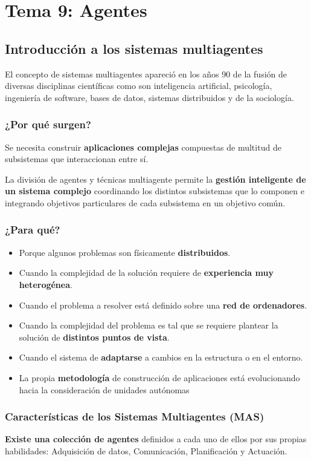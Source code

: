 \documentclass[12pt, twoside, openright]{report} %
\begin{document}
\chapter{Tema 9: Agentes}
\section{Introducción a los sistemas multiagentes}
El concepto de sistemas multiagentes apareció en los años 90 de la fusión de diversas disciplinas científicas como son inteligencia artificial, psicología, ingeniería de software, bases de datos, sistemas distribuidos y de la sociología.

\subsection{¿Por qué surgen?}
Se necesita construir \textbf{aplicaciones complejas} compuestas de multitud de subsistemas que interaccionan entre sí.

La división de agentes y técnicas multiagente permite la \textbf{gestión inteligente de un sistema complejo} coordinando los distintos subsistemas que lo componen e integrando objetivos particulares de cada subsistema en un objetivo común.

\subsection{¿Para qué?}
\begin{itemize}
	\item Porque algunos problemas son físicamente \textbf{distribuidos}.
	\item Cuando la complejidad de la solución requiere de \textbf{experiencia muy heterogénea}.
	\item Cuando el problema a resolver está definido sobre una \textbf{red de ordenadores}.
	\item Cuando la complejidad del problema es tal que se requiere plantear la solución de \textbf{distintos puntos de vista}.
	\item Cuando el sistema de \textbf{adaptarse} a cambios en la estructura o en el entorno.
	\item La propia \textbf{metodología} de construcción de aplicaciones está evolucionando hacia la consideración de unidades autónomas
\end{itemize}

\subsection{Características de los Sistemas Multiagentes (MAS)}
\textbf{Existe una colección de agentes} definidos a cada uno de ellos por sus propias habilidades: Adquisición de datos, Comunicación, Planificación y Actuación.
\end{document}
